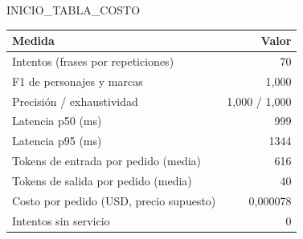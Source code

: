 INICIO_TABLA_COSTO
\begin{tabular}{@{}lr@{}}\toprule
Medida & Valor\\\midrule
Intentos (frases por repeticiones) & 70\\
F1 de personajes y marcas & 1,000\\
Precisión / exhaustividad & 1,000 / 1,000\\
Latencia p50 (ms) & 999\\
Latencia p95 (ms) & 1344\\
Tokens de entrada por pedido (media) & 616\\
Tokens de salida por pedido (media) & 40\\
Costo por pedido (USD, precio supuesto) & 0,000078\\
Intentos sin servicio & 0\\
\bottomrule\end{tabular}
